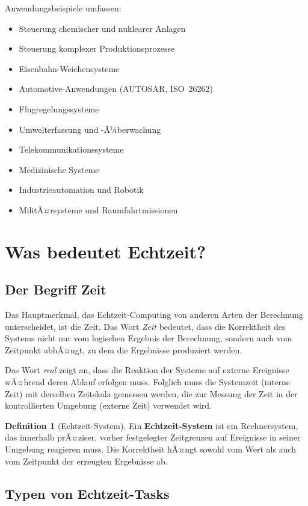 ﻿\documentclass[a4paper,12pt]{report}
\theoremstyle{definition}
\newtheorem{definition}{Definition}[chapter]
\begin{document}
Anwendungsbeispiele umfassen:
\begin{itemize}
	\item Steuerung chemischer und nuklearer Anlagen
	\item Steuerung komplexer Produktionsprozesse
	\item Eisenbahn-Weichensysteme
	\item Automotive-Anwendungen (AUTOSAR, ISO~26262)
	\item Flugregelungssysteme
	\item Umwelterfassung und -Ã¼berwachung
	\item Telekommunikationssysteme
	\item Medizinische Systeme
	\item Industrieautomation und Robotik
	\item MilitÃ¤rsysteme und Raumfahrtmissionen
\end{itemize}

\section{Was bedeutet Echtzeit?}

\subsection{Der Begriff Zeit}

Das Hauptmerkmal, das Echtzeit-Computing von anderen Arten der Berechnung unterscheidet,
ist die Zeit. Das Wort \emph{Zeit} bedeutet, dass die Korrektheit des Systems nicht nur
vom logischen Ergebnis der Berechnung, sondern auch vom Zeitpunkt abhÃ¤ngt, zu dem
die Ergebnisse produziert werden.

Das Wort \emph{real} zeigt an, dass die Reaktion der Systeme auf externe Ereignisse
wÃ¤hrend deren Ablauf erfolgen muss. Folglich muss die Systemzeit (interne Zeit) mit
derselben Zeitskala gemessen werden, die zur Messung der Zeit in der kontrollierten
Umgebung (externe Zeit) verwendet wird.

\begin{definition}[Echtzeit-System]
	Ein \textbf{Echtzeit-System} ist ein Rechnersystem, das innerhalb prÃ¤ziser,
	vorher festgelegter Zeitgrenzen auf Ereignisse in seiner Umgebung reagieren muss.
	Die Korrektheit hÃ¤ngt sowohl vom Wert als auch vom Zeitpunkt der erzeugten
	Ergebnisse ab.
\end{definition}

\subsection{Typen von Echtzeit-Tasks}
\end{document}

